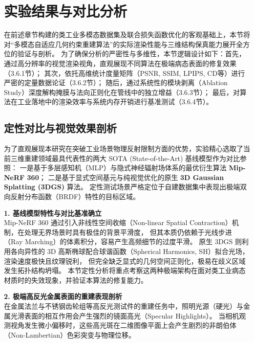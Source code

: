 
\section{实验结果与对比分析}
\label{sec:chap3_experimental_results}

在前述章节构建的类工业多模态数据集及联合损失函数优化的客观基础上，本节将对“多模态自适应几何约束重建算法”的实际渲染性能与三维结构保真能力展开全方位的验证与剖析。
为了确保分析的严密性与多维性，本节逻辑设计如下：首先，通过高分辨率的视觉渲染视角，直观展现不同算法在极端病态表面的修复效果（3.6.1节）；
其次，依托高维统计度量矩阵（PSNR, SSIM, LPIPS, CD等）进行严密的定量数据论证（3.6.2节）；
随后，通过系统性的模块剥离（Ablation Study）深度解构掩膜与法向正则化在管线中的独立增益（3.6.3节）；
最后，对算法在工业落地中的渲染效率与系统内存开销进行基准测试（3.6.4节）。

\subsection{定性对比与视觉效果剖析}
\label{subsec:qualitative_analysis}

为了直观展现本研究在突破工业场景物理反射限制方面的优势，实验精心选取了当前三维重建领域最具代表性的两大 SOTA (State-of-the-Art) 基线模型作为对比参照：
一是基于多层感知机（MLP）与隐式神经辐射场体系的最优衍生算法 \textbf{Mip-NeRF 360}；
二是基于显式空间基元与纯视觉优化的原生 \textbf{3D Gaussian Splatting (3DGS)} 算法。
定性测试场景严格定位于自建数据集中表现出极端双向反射分布函数（BRDF）特性的目标区域。

\textbf{1. 基线模型特性与对比基准确立} \\
Mip-NeRF 360 通过引入非线性空间收缩（Non-linear Spatial Contraction）机制，在处理无界场景时具有极佳的背景平滑度，
但其本质仍依赖于光线步进（Ray Marching）的体素积分，容易产生高频细节的过度平滑。
原生 3DGS 则利用各向异性的 3D 高斯椭球配合球谐函数（Spherical Harmonics, SH）拟合光场，渲染速度极快且纹理锐利，
但完全缺乏显式的几何空间正则化，极易在歧义区域发生拓扑结构坍塌。
本节定性分析将重点考察这两种极端架构在面对类工业病态材质时的失效现象，并验证本算法的修复能力。

\textbf{2. 极端高反光金属表面的重建表现剖析} \\
在金属法兰与不锈钢齿轮组等高反光测试件的重建任务中，照明光源（硬光）与金属光滑表面的相互作用会产生强烈的镜面高光（Specular Highlights）。
当相机观测视角发生微小偏移时，这些高光斑在二维图像平面上会产生剧烈的非朗伯体（Non-Lambertian）色彩突变与物理位移。


